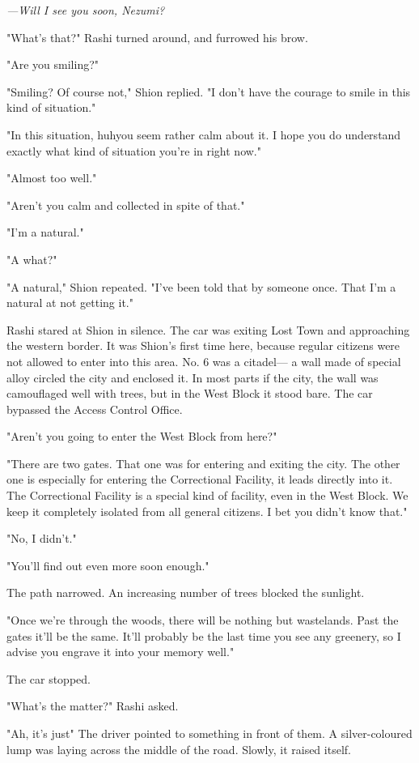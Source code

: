 \emph{---Will I see you soon, Nezumi?}

"What's that?" Rashi turned around, and furrowed his brow.

"Are you smiling?"

"Smiling? Of course not," Shion replied. "I don't have the courage to
smile in this kind of situation."

"In this situation, huh\el you seem rather calm about it. I hope you do
understand exactly what kind of situation you're in right now."

"Almost too well."

"Aren't you calm and collected in spite of that."

"I'm a natural."

"A what?"

"A natural," Shion repeated. "I've been told that by someone once. That
I'm a natural at not getting it."

Rashi stared at Shion in silence. The car was exiting Lost Town and
approaching the western border. It was Shion's first time here, because
regular citizens were not allowed to enter into this area. No. 6 was a
citadel--- a wall made of special alloy circled the city and enclosed it.
In most parts if the city, the wall was camouflaged well with trees, but
in the West Block it stood bare. The car bypassed the Access Control
Office.

"Aren't you going to enter the West Block from here?"

"There are two gates. That one was for entering and exiting the city.
The other one is especially for entering the Correctional Facility, it
leads directly into it. The Correctional Facility is a special kind of
facility, even in the West Block. We keep it completely isolated from
all general citizens. I bet you didn't know that."

"No, I didn't."

"You'll find out even more soon enough."

The path narrowed. An increasing number of trees blocked the sunlight.

"Once we're through the woods, there will be nothing but wastelands.
Past the gates it'll be the same. It'll probably be the last time you
see any greenery, so I advise you engrave it into your memory well."

The car stopped.

"What's the matter?" Rashi asked.

"Ah, it's just\el " The driver pointed to something in front of them. A
silver-coloured lump was laying across the middle of the road. Slowly,
it raised itself.

